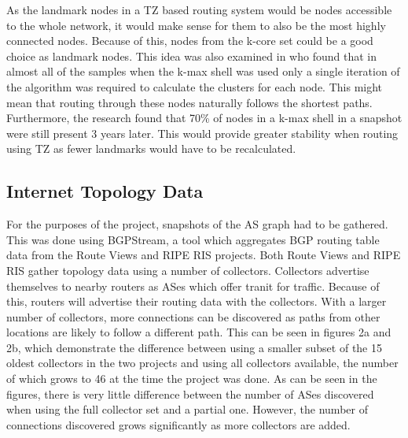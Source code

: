 \documentclass{dissertation/mpaper}
\begin{document}
As the landmark nodes in a TZ based routing system would be nodes accessible to the whole network, it would make sense for them to also be the most highly connected nodes. Because of this, nodes from the k-core set could be a good choice as landmark nodes. This idea was also examined in \cite{strowes} who found that in almost all of the samples when the k-max shell was used only a single iteration of the algorithm was required to calculate the clusters for each node. This might mean that routing through these nodes naturally follows the shortest paths. Furthermore, the research found that 70\% of nodes in a k-max shell in a snapshot were still present 3 years later. This would provide greater stability when routing using TZ as fewer landmarks would have to be recalculated. 

\subsection{Internet Topology Data}
For the purposes of the project, snapshots of the AS graph had to be gathered. This was done using BGPStream, a tool which aggregates BGP routing table data from the Route Views and RIPE RIS projects. Both Route Views and RIPE RIS gather topology data using a number of collectors. Collectors advertise themselves to nearby routers as ASes which offer tranit for traffic. Because of this, routers will advertise their routing data with the collectors. With a larger number of collectors, more connections can be discovered as paths from other locations are likely to follow a different path. This can be seen in figures 2a and 2b, which demonstrate the difference between using a smaller subset of the 15 oldest collectors in the two projects and using all collectors available, the number of which grows to 46 at the time the project was done. As can be seen in the figures, there is very little difference between the number of ASes discovered when using the full collector set and a partial one. However, the number of connections discovered grows significantly as more collectors are added.
\end{document}
